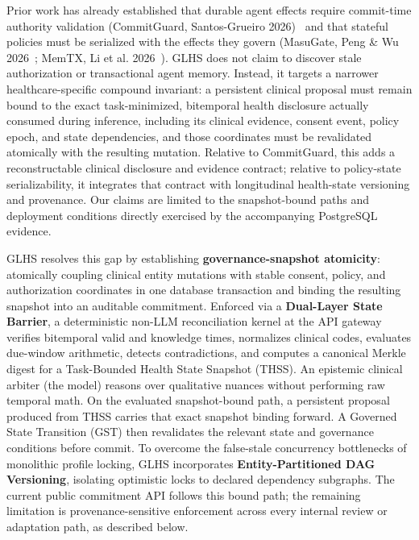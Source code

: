 \documentclass[11pt]{article}
\begin{document}
Prior work has already established that durable agent effects require commit-time authority validation (CommitGuard, Santos-Grueiro 2026)~\cite{temporaryauth} and that stateful policies must be serialized with the effects they govern (MasuGate, Peng \& Wu 2026~\cite{statefulgov}; MemTX, Li et al. 2026~\cite{memtx}). GLHS does not claim to discover stale authorization or transactional agent memory. Instead, it targets a narrower healthcare-specific compound invariant: a persistent clinical proposal must remain bound to the exact task-minimized, bitemporal health disclosure actually consumed during inference, including its clinical evidence, consent event, policy epoch, and state dependencies, and those coordinates must be revalidated atomically with the resulting mutation. Relative to CommitGuard, this adds a reconstructable clinical disclosure and evidence contract; relative to policy-state serializability, it integrates that contract with longitudinal health-state versioning and provenance. Our claims are limited to the snapshot-bound paths and deployment conditions directly exercised by the accompanying PostgreSQL evidence.

GLHS resolves this gap by establishing \textbf{governance-snapshot atomicity}: atomically coupling clinical entity mutations with stable consent, policy, and authorization coordinates in one database transaction and binding the resulting snapshot into an auditable commitment. Enforced via a \textbf{Dual-Layer State Barrier}, a deterministic non-LLM reconciliation kernel at the API gateway verifies bitemporal valid and knowledge times, normalizes clinical codes, evaluates due-window arithmetic, detects contradictions, and computes a canonical Merkle digest for a Task-Bounded Health State Snapshot (THSS). An epistemic clinical arbiter (the model) reasons over qualitative nuances without performing raw temporal math. On the evaluated snapshot-bound path, a persistent proposal produced from THSS carries that exact snapshot binding forward. A Governed State Transition (GST) then revalidates the relevant state and governance conditions before commit. To overcome the false-stale concurrency bottlenecks of monolithic profile locking, GLHS incorporates \textbf{Entity-Partitioned DAG Versioning}, isolating optimistic locks to declared dependency subgraphs. The current public commitment API follows this bound path; the remaining limitation is provenance-sensitive enforcement across every internal review or adaptation path, as described below.
\end{document}
